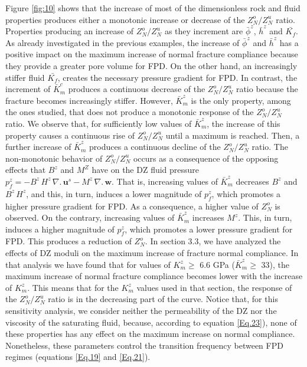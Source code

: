 \documentclass[draft]{agujournal2019}
\begin{document}
Figure \ref{fig:10} shows that the increase of most of the dimensionless rock and fluid properties produces either a monotonic increase or decrease of the $Z_N^o/Z_N^u$ ratio. Properties producing an increase of $Z_N^o/Z_N^u$ as they increment are $\bar{\phi}^z$, $\bar{h}^z$ and $\bar{K_f}$. As already investigated in the previous examples, the increase of $\bar{\phi}^z$ and $\bar{h}^z$ has a positive impact on the maximum increase of normal fracture compliance because they provide a greater pore volume for FPD. On the other hand, an increasingly stiffer fluid $\bar{K_f}$, creates the necessary pressure gradient for FPD.
In contrast, the increment of $\bar{K}_m^c$ produces a continuous decrease of the $Z_N^o/Z_N^u$ ratio because the fracture becomes increasingly stiffer. However,  $\bar{K}_m^z$  is the only property, among the ones studied, that does not produce a monotonic response of the  $Z_N^o/Z_N^u$ ratio. We observe that, for sufficiently low values of $\bar{K}_m^z$, the increase of this property causes a continuous rise of  $Z_N^o/Z_N^u$ until a maximum  is reached. Then, a further increase of $\bar{K}_m^z$ produces a continuous decline of the $Z_N^o/Z_N^u$ ratio. 
The non-monotonic behavior of  $Z_N^o/Z_N^u$ occurs as a consequence of the opposing effects that $B^z$ and $M^Z$ have on the DZ fluid pressure $p_f^z=- B^z \, H^z \, \nabla . \, \bm{u}^s - M ^z\, \nabla . \, \bm{w}$. That is, increasing values of $\bar{K}_m^z$ decreases $B^z$ and $B^z \, H^z$, and this, in turn, induces a lower magnitude of $p_f^z$,  which promotes a higher pressure gradient for FPD. As a consequence, a higher value of $Z_N^o$  is observed. On the contrary, increasing values of $\bar{K}_m^z$ increases $M^z$. This, in turn, induces a higher magnitude of $p_f^z$, which promotes a lower pressure gradient for FPD. This produces a reduction of $Z_N^o$.  
In section 3.3, we have  analyzed the effects of DZ moduli on the maximum increase of fracture normal compliance.
In that analysis we have found that for values of  $K_m^z \geq$ 6.6 GPa ($\bar{K}_m^z \geq$ 33), the maximum increase of normal fracture compliance becomes lower with the increase of  $K_m^z$. This  means that for the $K_m^z$  values used in that section, the response of the $Z_N^o/Z_N^u$  ratio is in the decreasing part of the curve.
Notice that, for this sensitivity analysis, we consider neither the permeability of the DZ nor the viscosity of the saturating fluid, because, according to equation \eqref{Eq.23}), none of these properties has any effect on the maximum increase on normal compliance. Nonetheless, these parameters control the transition frequency between FPD regimes (equations \eqref{Eq.19} and \eqref{Eq.21}).
\end{document}
